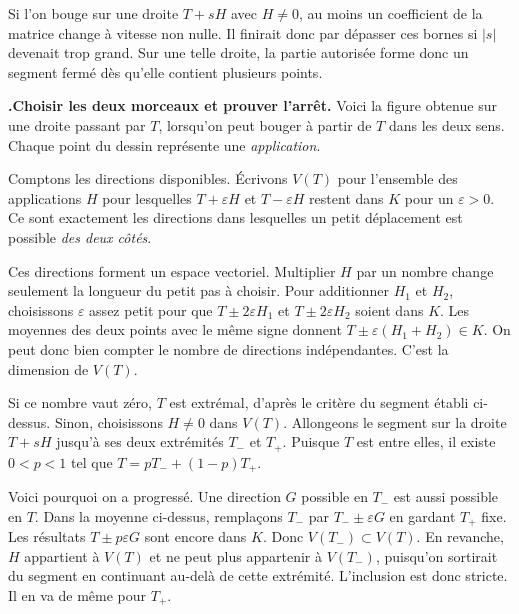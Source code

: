 \documentclass[a4paper,12pt]{article}
\newcounter{pas}
\newcommand{\etape}[1]{\par\Needspace{2.25\baselineskip}\smallskip\stepcounter{pas}%
  \textbf{\textcolor{deep}{\thepas.\enspace #1}}\enspace\ignorespaces}
\begin{document}
Si l'on bouge sur une droite $T+sH$ avec $H\ne0$, au moins un coefficient de la matrice change à vitesse non nulle. Il finirait donc par dépasser ces bornes si $|s|$ devenait trop grand. Sur une telle droite, la partie autorisée forme donc un segment fermé dès qu'elle contient plusieurs points.

\etape{Choisir les deux morceaux et prouver l'arrêt.}
Voici la figure obtenue sur une droite passant par $T$, lorsqu'on peut bouger à partir de $T$ dans les deux sens. Chaque point du dessin représente une \emph{application}.

\begin{center}
\end{center}

Comptons les directions disponibles. Écrivons $V(T)$ pour l'ensemble des applications $H$ pour lesquelles $T+\varepsilon H$ et $T-\varepsilon H$ restent dans $K$ pour un $\varepsilon>0$. Ce sont exactement les directions dans lesquelles un petit déplacement est possible \emph{des deux côtés}.

Ces directions forment un espace vectoriel. Multiplier $H$ par un nombre change seulement la longueur du petit pas à choisir. Pour additionner $H_1$ et $H_2$, choisissons $\varepsilon$ assez petit pour que $T\pm2\varepsilon H_1$ et $T\pm2\varepsilon H_2$ soient dans $K$. Les moyennes des deux points avec le même signe donnent $T\pm\varepsilon(H_1+H_2)\in K$. On peut donc bien compter le nombre de directions indépendantes. C'est la dimension de $V(T)$.

Si ce nombre vaut zéro, $T$ est extrémal, d'après le critère du segment établi ci-dessus. Sinon, choisissons $H\ne0$ dans $V(T)$. Allongeons le segment sur la droite $T+sH$ jusqu'à ses deux extrémités $T_-$ et $T_+$. Puisque $T$ est entre elles, il existe $0<p<1$ tel que $T=pT_-+(1-p)T_+$.

Voici pourquoi on a progressé. Une direction $G$ possible en $T_-$ est aussi possible en $T$. Dans la moyenne ci-dessus, remplaçons $T_-$ par $T_-\pm\varepsilon G$ en gardant $T_+$ fixe. Les résultats $T\pm p\varepsilon G$ sont encore dans $K$. Donc $V(T_-)\subset V(T)$. En revanche, $H$ appartient à $V(T)$ et ne peut plus appartenir à $V(T_-)$, puisqu'on sortirait du segment en continuant au-delà de cette extrémité. L'inclusion est donc stricte. Il en va de même pour $T_+$.
\end{document}

